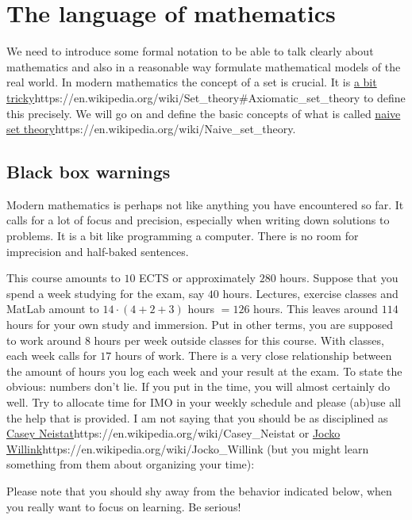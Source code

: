 \documentclass{article}
\begin{document}

\chapter{The language of mathematics}

We need to introduce some formal notation to be able to talk clearly about mathematics and also in a reasonable way 
formulate mathematical models of the real world. In modern mathematics the 
concept of a set is crucial. It is \url{a bit tricky}{https://en.wikipedia.org/wiki/Set_theory\#Axiomatic_set_theory} to define this precisely.
We will go on and define the basic concepts of what is called 
\url{naive set theory}{https://en.wikipedia.org/wiki/Naive_set_theory}.

\begin{frameit}
  \section{Black box warnings}

Modern mathematics is perhaps not like
anything you have encountered so far. It calls for a lot of focus and precision, especially when
writing down solutions to problems. It is a bit like programming a computer. There is no room for imprecision and half-baked sentences.

This course amounts to $10$ ECTS or approximately $280$ hours. Suppose that you spend
a week studying for the exam, say $40$ hours. Lectures, exercise classes and MatLab amount to $14\cdot (4 + 2 + 3)$ hours $= 126$ hours. This leaves around $114$ hours for your own study and immersion. Put in
other terms, you are supposed to work around $8$ hours per week outside classes for this course. With
classes, each week calls for $17$ hours of work. There is a very close relationship between the amount
of hours you log each week and your result at the exam. To state the obvious: numbers don't lie. If you
put in the time, you will almost certainly do well. Try to allocate time for IMO in your weekly
schedule and please (ab)use all the help that is provided. I am not saying that you should be as
disciplined as \url{Casey Neistat}{https://en.wikipedia.org/wiki/Casey_Neistat} or \url{Jocko Willink}{https://en.wikipedia.org/wiki/Jocko_Willink} (but you might learn something from them about organizing your time):


Please note that you should shy away from the behavior indicated below, when you really want to focus on
learning. Be serious!


\end{frameit}
\end{document}
